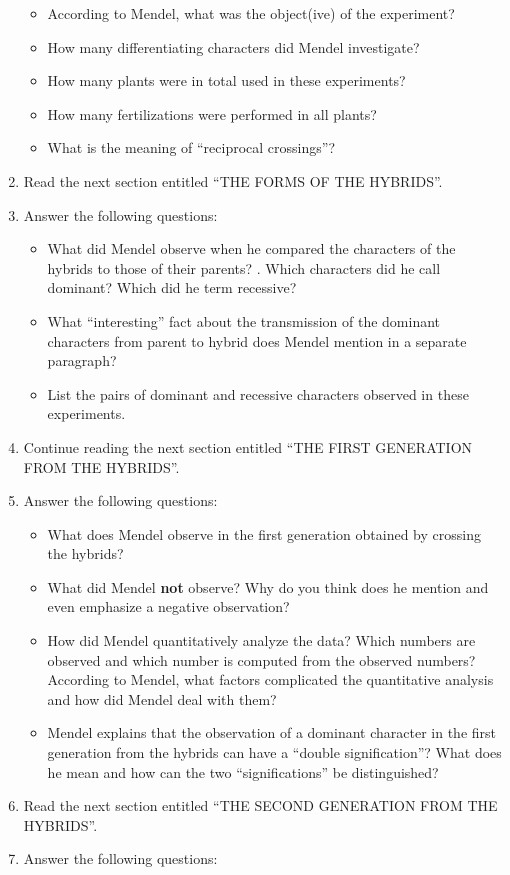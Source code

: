 \documentclass[]{book}
\providecommand{\tightlist}{%
  \setlength{\itemsep}{0pt}\setlength{\parskip}{0pt}}
\begin{document}
\begin{enumerate}
  \begin{itemize}
  \tightlist
  \item
    According to Mendel, what was the object(ive) of the experiment?
  \item
    How many differentiating characters did Mendel investigate?
  \item
    How many plants were in total used in these experiments?
  \item
    How many fertilizations were performed in all plants?
  \item
    What is the meaning of ``reciprocal crossings''?
  \end{itemize}
\item
  Read the next section entitled ``THE FORMS OF THE HYBRIDS''.
\item
  Answer the following questions:

  \begin{itemize}
  \tightlist
  \item
    What did Mendel observe when he compared the characters of the hybrids to those of their parents?
    . Which characters did he call dominant? Which did he term recessive?
  \item
    What ``interesting'' fact about the transmission of the dominant characters from parent to hybrid does Mendel mention in a separate paragraph?
  \item
    List the pairs of dominant and recessive characters observed in these experiments.
  \end{itemize}
\item
  Continue reading the next section entitled ``THE FIRST GENERATION FROM THE HYBRIDS''.
\item
  Answer the following questions:

  \begin{itemize}
  \tightlist
  \item
    What does Mendel observe in the first generation obtained by crossing the hybrids?
  \item
    What did Mendel \textbf{not} observe? Why do you think does he mention and even emphasize a negative observation?
  \item
    How did Mendel quantitatively analyze the data? Which numbers are observed and which number is computed from the observed numbers? According to Mendel, what factors complicated the quantitative analysis and how did Mendel deal with them?
  \item
    Mendel explains that the observation of a dominant character in the first generation from the hybrids can have a ``double signification''? What does he mean and how can the two ``significations'' be distinguished?
  \end{itemize}
\item
  Read the next section entitled ``THE SECOND GENERATION FROM THE HYBRIDS''.
\item
  Answer the following questions:


\end{enumerate}
\end{document}
